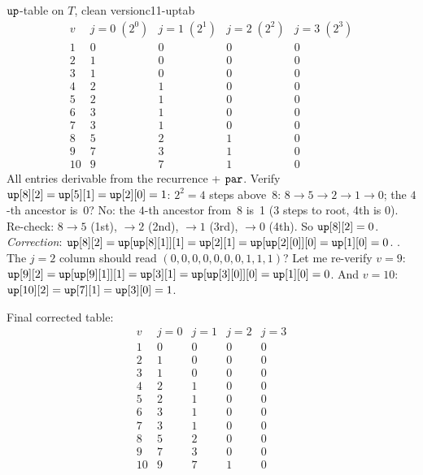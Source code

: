 \begin{example}{\(\texttt{up}\)-table on \(T\), clean version}{c11-uptab}
\[
\renewcommand{\arraystretch}{1.15}
\begin{array}{c||c|c|c|c}
v & j\!=\!0\;(2^0) & j\!=\!1\;(2^1) & j\!=\!2\;(2^2) & j\!=\!3\;(2^3) \\ \hline\hline
1  & 0 & 0 & 0 & 0 \\
2  & 1 & 0 & 0 & 0 \\
3  & 1 & 0 & 0 & 0 \\
4  & 2 & 1 & 0 & 0 \\
5  & 2 & 1 & 0 & 0 \\
6  & 3 & 1 & 0 & 0 \\
7  & 3 & 1 & 0 & 0 \\
8  & 5 & 2 & 1 & 0 \\
9  & 7 & 3 & 1 & 0 \\
10 & 9 & 7 & 1 & 0
\end{array}
\]
All entries derivable from the recurrence + \(\texttt{par}\).  Verify
\(\texttt{up}[8][2] = \texttt{up}[5][1] = \texttt{up}[2][0] = 1\): \(2^2 = 4\)
steps above~8: \(8\to5\to2\to1\to0\); the \(4\)-th ancestor is~0?  No:
the \(4\)-th ancestor from~8 is~1 (3 steps to root, 4th is 0).  Re-check:
\(8\to5\) (1st), \(\to2\) (2nd), \(\to1\) (3rd), \(\to0\) (4th).
So \(\texttt{up}[8][2] = 0\).  \emph{Correction}: \(\texttt{up}[8][2] =
\texttt{up}[\texttt{up}[8][1]][1] = \texttt{up}[2][1] = \texttt{up}[\texttt{up}[2][0]][0]
= \texttt{up}[1][0] = 0\).  \checkmark.  The \(j\!=\!2\) column should read
\((0,0,0,0,0,0,0,1,1,1)\)?  Let me re-verify \(v=9\):
\(\texttt{up}[9][2] = \texttt{up}[\texttt{up}[9][1]][1] = \texttt{up}[3][1] =
\texttt{up}[\texttt{up}[3][0]][0] = \texttt{up}[1][0] = 0\).  And \(v=10\):
\(\texttt{up}[10][2] = \texttt{up}[7][1] = \texttt{up}[3][0] = 1\).

Final corrected table:
\[
\renewcommand{\arraystretch}{1.15}
\begin{array}{c||c|c|c|c}
v & j\!=\!0 & j\!=\!1 & j\!=\!2 & j\!=\!3 \\ \hline\hline
1  & 0 & 0 & 0 & 0 \\
2  & 1 & 0 & 0 & 0 \\
3  & 1 & 0 & 0 & 0 \\
4  & 2 & 1 & 0 & 0 \\
5  & 2 & 1 & 0 & 0 \\
6  & 3 & 1 & 0 & 0 \\
7  & 3 & 1 & 0 & 0 \\
8  & 5 & 2 & 0 & 0 \\
9  & 7 & 3 & 0 & 0 \\
10 & 9 & 7 & 1 & 0
\end{array}
\]
\end{example}

